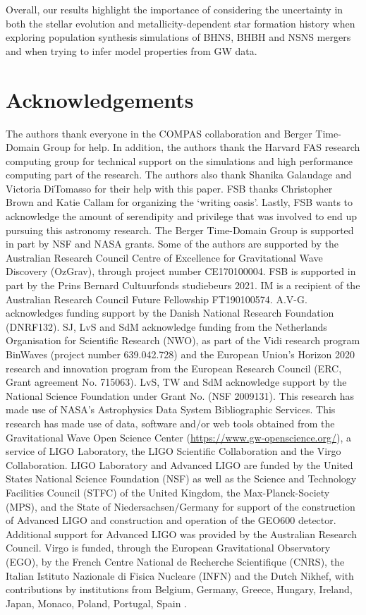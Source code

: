 \documentclass[fleqn,usenatbib]{mnras}
\begin{document}
Overall, our results highlight the importance of considering the uncertainty in both the stellar evolution and metallicity-dependent star formation history when exploring population synthesis simulations of BHNS, BHBH and NSNS mergers and when trying to infer model properties from GW data. 



\section*{Acknowledgements}

The authors thank everyone in the COMPAS collaboration and Berger Time-Domain Group for help. In addition, the authors thank the Harvard FAS research computing group for technical support on the simulations and high performance computing part of the research. The authors also thank Shanika Galaudage and Victoria DiTomasso for their help with this paper. FSB thanks Christopher Brown and Katie Callam for organizing the `writing oasis'.   Lastly, FSB wants to acknowledge the  amount of serendipity and privilege that was involved to end up pursuing this astronomy research. The Berger Time-Domain Group is supported in part by NSF and NASA grants. Some of the authors are supported by the Australian Research Council Centre of Excellence for Gravitational Wave Discovery (OzGrav), through project number CE170100004. FSB is supported in part by the Prins Bernard Cultuurfonds studiebeurs 2021. IM is a recipient of the Australian Research Council Future Fellowship FT190100574. A.V-G. acknowledges funding support by the Danish National Research Foundation (DNRF132). SJ, LvS and SdM acknowledge funding from the Netherlands Organisation for Scientific Research (NWO), as part of the Vidi research program BinWaves (project number 639.042.728) and the European Union’s Horizon 2020 research and innovation program from the European Research Council (ERC, Grant agreement No. 715063). LvS, TW and SdM acknowledge support by the National Science Foundation under Grant No. (NSF 2009131). This research has made use of NASA’s Astrophysics Data System Bibliographic Services. This research has made use of data, software and/or web tools obtained from the Gravitational Wave Open Science Center (\url{https://www.gw-openscience.org/}), a service of LIGO Laboratory, the LIGO Scientific Collaboration and the Virgo Collaboration. LIGO Laboratory and Advanced LIGO \citep{2015CQGra..32g4001L} are funded by the United States National Science Foundation (NSF) as well as the Science and Technology Facilities Council (STFC) of the United Kingdom, the Max-Planck-Society (MPS), and the State of Niedersachsen/Germany for support of the construction of Advanced LIGO and construction and operation of the GEO600 detector. Additional support for Advanced LIGO was provided by the Australian Research Council. Virgo \citep{2015CQGra..32b4001A} is funded, through the European Gravitational Observatory (EGO), by the French Centre National de Recherche Scientifique (CNRS), the Italian Istituto Nazionale di Fisica Nucleare (INFN) and the Dutch Nikhef, with contributions by institutions from Belgium, Germany, Greece, Hungary, Ireland, Japan, Monaco, Poland, Portugal, Spain \citep{ligo_scientific_collaboration_and_virgo_2021_5655785}.
\end{document}
